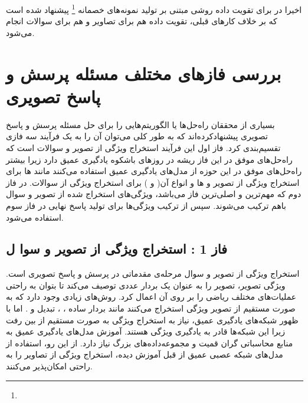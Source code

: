   اخیرا در
 \cite{tang2020semantic}
 برای تقویت داده روشی مبتنی بر تولید نمونه‌های خصمانه
 \footnote{}
 پیشنهاد شده است که بر خلاف کارهای قبلی، تقویت داده هم برای تصاویر و هم برای سوالات انجام می‌شود.
 
 
\section{بررسی فازهای مختلف مسئله پرسش و پاسخ تصویری}
بسیاری از محققان راه‌حل‌ها یا الگوریتم‌هایی را برای حل مسئله پرسش و پاسخ تصویری پیشنهاد‌کرده‌اند که به طور کلی می‌توان آن را به یک فرآیند سه فازی تقسیم‌بندی کرد. فاز اول این فرآیند استخراج ویژگی از تصویر و سوالات است که راه‌حل‌های موفق در این فاز ریشه در روزهای باشکوه یادگیری عمیق دارد زیرا بیشتر راه‌حل‌های موفق در این حوزه از مدل‌های یادگیری عمیق استفاده می‌کنند مانند 
 ها برای استخراج ویژگی از  تصویر و 
  ها و انواع آن(
  و
  ) برای استخراج ویژگی از سوالات. در فاز دوم که مهم‌ترین و اصلی‌ترین فاز می‌باشد، ویژگی‌های استخراج شده از تصویر و سوال باهم ترکیب می‌شوند. سپس از ترکیب ویژگی‌ها برای تولید پاسخ نهایی در فاز سوم استفاده می‌شود.
\subsection{فاز 1 : استخراج ویژگی از تصویر و سوا ل} \label{sec:extract}

		استخراج ویژگی از تصویر و سوال مرحله‌ی مقدماتی در پرسش و پاسخ تصویری است. ویژگی تصویر، تصویر را به عنوان یک بردار عددی  توصیف می‌کند تا بتوان به راحتی عملیات‌های مختلف ریاضی را بر روی آن اعمال کرد. روش‌های زیادی وجود دارد که به صورت مستقیم از تصویر ویژگی استخراج می‌کنند مانند بردار ساده 
		،
		، تبدیل
		و 
		.
		اما با ظهور شبکه‌های یادگیری عمیق، نیاز به استخراج ویژگی به صورت مستقیم از بین رفت زیرا این شبکه‌ها قادر به یادگیری ویژگی هستند. آموزش مدل‌های یادگیری عمیق به منابع محاسباتی گران قمیت و مجموعه‌داده‌های بزرگ نیاز دارد. از این رو، استفاده از مدل‌های شبکه عصبی عمیق از قبل آموزش دیده، استخراج ویژگی‌ از تصاویر را به راحتی امکان‌پذیر می‌کنند. 
		
